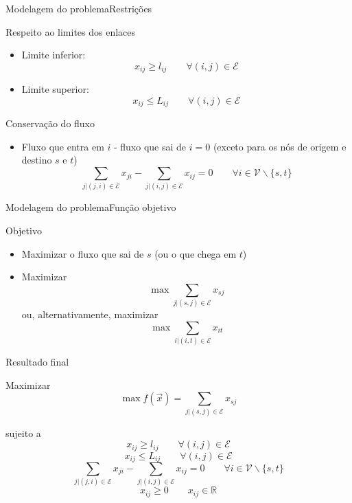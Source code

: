 \documentclass{beamer}
\newenvironment{outeritemize}{\begin{itemize}}{\end{itemize}\vspace{12pt}}
\begin{document}
\begin{frame}{Modelagem do problema}{Restrições}

Respeito ao limites dos enlaces
\begin{outeritemize}
    \item Limite inferior: $$x_{ij}\geq l_{ij}\qquad\forall(i, j)\in \mathcal{E}$$
    \item Limite superior: $$x_{ij}\leq L_{ij}\qquad\forall(i, j)\in \mathcal{E}$$
\end{outeritemize}

Conservação do fluxo
\begin{outeritemize}
    \item Fluxo que entra em $i$ - fluxo que sai de $i = 0$ (exceto para os nós de origem e destino $s$ e $t$)
    $$\sum_{j|(j,i)\in \mathcal{E}}x_{ji}-\sum_{j|(i,j)\in \mathcal{E}}x_{ij}=0\qquad \forall i\in \mathcal{V}\backslash \{s,t\}$$
\end{outeritemize}

\end{frame}

\begin{frame}{Modelagem do problema}{Função objetivo}

Objetivo
\begin{outeritemize}
    \item Maximizar o fluxo que sai de $s$ (ou o que chega em $t$)
    \item Maximizar $$\max\sum_{j|(s,j)\in \mathcal{E}}x_{sj}$$ ou, alternativamente, maximizar $$\max\sum_{i|(i,t)\in \mathcal{E}}x_{it}$$
\end{outeritemize}

\end{frame}

\begin{frame}{Resultado final}

Maximizar $$\max f(\vec{x}) =  \sum_{j|(s,j)\in \mathcal{E}}x_{sj}$$

sujeito a 
$$x_{ij}\geq l_{ij}\qquad\forall(i, j)\in \mathcal{E}$$
$$x_{ij}\leq L_{ij}\qquad\forall(i, j)\in \mathcal{E}$$ 
$$\sum_{j|(j,i)\in \mathcal{E}}x_{ji}-\sum_{j|(i,j)\in \mathcal{E}}x_{ij}=0\qquad \forall i\in \mathcal{V}\backslash \{s,t\}$$ 
$$x_{ij}\geq 0\qquad x_{ij}\in \mathbb{R}$$

\end{frame}

\end{document}
